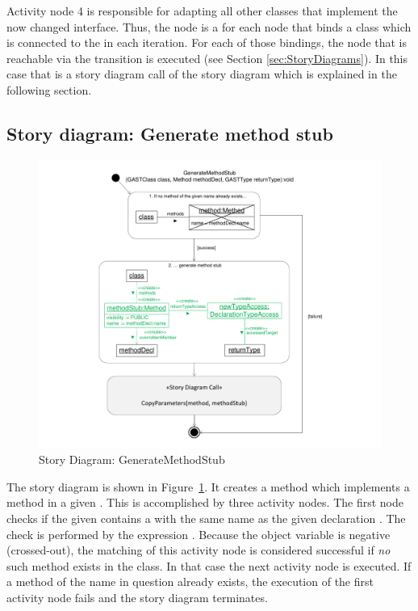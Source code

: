 Activity node 4 is responsible for adapting all other classes that implement the now changed interface. Thus, the node is a for each node that binds a class which is connected to the  in each iteration. For each of those bindings, the node that is reachable via the  transition is executed (see Section \ref{sec:StoryDiagrams}). In this case that is a story diagram call of the story diagram  which is explained in the following section.

\subsection{Story diagram: Generate method stub}

\begin{figure}[hbtp]
\centering
\includegraphics[width=0.9\linewidth]{./figures/SDGenerateMethodStub}
\caption{Story Diagram: GenerateMethodStub}
\label{fig:SDGenerateMethodStub}
\end{figure}

The story diagram  is shown in Figure~\ref{fig:SDGenerateMethodStub}. It creates a method which implements a method  in a given . This is accomplished by three activity nodes. The first node checks if the given  contains a  with the same name as the given declaration . The check is performed by the expression . Because the object variable  is negative (crossed-out), the matching of this activity node is considered successful if \emph{no} such method exists in the class. In that case the next activity node is executed. If a method of the name in question already exists, the execution of the first activity node fails and the story diagram terminates.

